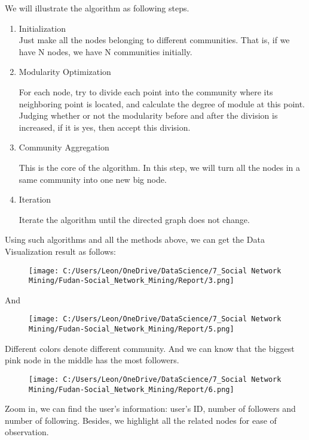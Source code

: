 \documentclass[]{article}
\begin{document}
We will illustrate the algorithm as following steps.

\begin{enumerate}
\def\labelenumi{\arabic{enumi}.}
\item
  Initialization\\

  Just make all the nodes belonging to different communities. That is,
  if we have N nodes, we have N communities initially.
\item
  Modularity Optimization

  For each node, try to divide each point into the community where its
  neighboring point is located, and calculate the degree of module at
  this point. Judging whether or not the modularity before and after the
  division is increased, if it is yes, then accept this division.
\item
  Community Aggregation

  This is the core of the algorithm. In this step, we will turn all the
  nodes in a same community into one new big node. 
\item
  Iteration

  Iterate the algorithm until the directed graph does not change.
\end{enumerate}

Using such algorithms and all the methods above, we can get the Data
Visualization result as follows:

\begin{figure}
\centering
\texttt{[image: C:/Users/Leon/OneDrive/DataScience/7\_Social Network Mining/Fudan-Social\_Network\_Mining/Report/3.png]}
\caption{}
\end{figure}

And

\begin{figure}
\centering
\texttt{[image: C:/Users/Leon/OneDrive/DataScience/7\_Social Network Mining/Fudan-Social\_Network\_Mining/Report/5.png]}
\caption{}
\end{figure}

Different colors denote different community. And we can know that the
biggest pink node in the middle has the most followers.

\begin{figure}
\centering
\texttt{[image: C:/Users/Leon/OneDrive/DataScience/7\_Social Network Mining/Fudan-Social\_Network\_Mining/Report/6.png]}
\caption{}
\end{figure}

Zoom in, we can find the user's information: user's ID, number of
followers and number of following. Besides, we highlight all the related
nodes for ease of observation.
\end{document}
